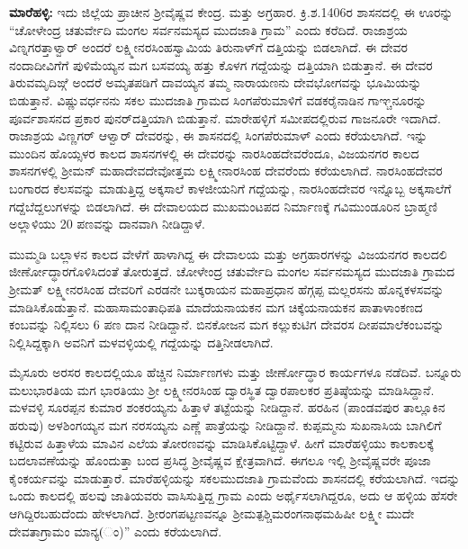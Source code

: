 \textbf{ಮಾರೆಹಳ್ಳಿ:} ಇದು ಜಿಲ್ಲೆಯ ಪ್ರಾಚೀನ ಶ‍್ರೀವೈಷ್ಣವ ಕೇಂದ್ರ. ಮತ್ತು ಅಗ್ರಹಾರ. ಕ್ರಿ.ಶ.1406ರ ಶಾಸನದಲ್ಲಿ ಈ ಊರನ್ನು “ಚೋಳೇಂದ್ರ ಚತುರ್ವೇದಿ ಮಂಗಲ ಸರ್ವನಮಸ್ಯದ ಮುದಜಾತಿ ಗ್ರಾಮ” ಎಂದು ಕರೆದಿದೆ. ರಾಜಾಶ್ರಯ ವಿಣ್ನಗರತ್ತಾಳ್ವಾರ್​ ಅಂದರೆ ಲಕ್ಷ್ಮೀನರಸಿಂಹಸ್ವಾಮಿಯ ತಿರುನಾಳ್​ಗೆ ದತ್ತಿಯನ್ನು ಬಿಡಲಾಗಿದೆ. ಈ ದೇವರ ನಂದಾದೀವಿಗೆಗೆ ಪುಳಿಮೆಯ್ಯನ ಮಗ ಬಸವಯ್ಯ ಹತ್ತು ಕೊಳಗ ಗದ್ದೆಯನ್ನು ದತ್ತಿಯಾಗಿ ಬಿಡುತ್ತಾನೆ. ಈ ದೇವರ ತಿರುವಮೃದಿಙ್ಗೆ ಅಂದರೆ ಅಮೃತಪಡಿಗೆ ದಾವಯ್ಯನ ತಮ್ಮ ನಾರಾಯಣನು ದೇವಭೋಗವನ್ನು ಭೂಮಿಯನ್ನು ಬಿಡುತ್ತಾನೆ. ವಿಷ್ಣುವರ್ಧನನು ಸಕಲ ಮುದಜಾತಿ ಗ್ರಾಮದ ಸಿಂಗಪೆರುಮಾಳಿಗೆ ವಡಕರೈನಾಡಿನ ಗಾಞ್ಚನೂರನ್ನು ಪೂರ್ವಶಾಸನದ ಪ್ರಕಾರ ಪುನರ್​ದತ್ತಿಯಾಗಿ ಬಿಡುತ್ತಾನೆ. ಮಾರೇಹಳ್ಳಿಗೆ ಸಮೀಪದಲ್ಲಿರುವ ಗಾಜನೂರೇ ಇದಾಗಿದೆ. ರಾಜಾಶ್ರಯ ವಿಣ್ಣಗರ್​ ಆಳ್ವಾರ್​ ದೇವರನ್ನು, ಈ ಶಾಸನದಲ್ಲಿ ಸಿಂಗಪೆರುಮಾಳ್​ ಎಂದು ಕರೆಯಲಾಗಿದೆ. ಇನ್ನು ಮುಂದಿನ ಹೊಯ್ಸಳರ ಕಾಲದ ಶಾಸನಗಳಲ್ಲಿ ಈ ದೇವರನ್ನು ನಾರಸಿಂಹದೇವರೆಂದೂ, ವಿಜಯನಗರ ಕಾಲದ ಶಾಸನಗಳಲ್ಲಿ ಶ‍್ರೀಮನ್​ ಮಹಾದೇವದೇವೋತ್ತಮ ಲಕ್ಷ್ಮೀನಾರಸಿಂಹ ದೇವರೆಂದು ಕರೆಯಲಾಗಿದೆ. ನಾರಸಿಂಹದೇವರ ಬಂಗಾರದ ಕೆಲಸವನ್ನು ಮಾಡುತ್ತಿದ್ದ ಅಕ್ಕಸಾಲೆ ಕಾಳಜೀಯನಿಗೆ ಗದ್ದೆಯನ್ನು, ನಾರಸಿಂಹದೇವರ ಇನ್ನೊಬ್ಬ ಅಕ್ಕಸಾಲೆಗೆ ಗದ್ದೆಬೆದ್ದಲುಗಳನ್ನು ಬಿಡಲಾಗಿದೆ. ಈ ದೇವಾಲಯದ ಮುಖಮಂಟಪದ ನಿರ್ಮಾಣಕ್ಕೆ ಗವಿಮುಂಡೂರಿನ ಬ್ರಾಹ್ಮಣಿ ಅಲ್ಲಾಳಿಯು 20 ಪಣವನ್ನು ದಾನವಾಗಿ ನೀಡಿದ್ದಾಳೆ.

ಮುಮ್ಮಡಿ ಬಲ್ಲಾಳನ ಕಾಲದ ವೇಳೆಗೆ ಹಾಳಾಗಿದ್ದ ಈ ದೇವಾಲಯ ಮತ್ತು ಅಗ್ರಹಾರಗಳನ್ನು ವಿಜಯನಗರ ಕಾಲದಲಿ ಜೀರ್ಣೋದ್ಧಾರಗೊಳಿಸಿದಂತೆ ತೋರುತ್ತದೆ. ಚೋಳೇಂದ್ರ ಚತುರ್ವೇದಿ ಮಂಗಲ ಸರ್ವನಮಸ್ಯದ ಮುದಜಾತಿ ಗ್ರಾಮದ ಶ‍್ರೀಮತ್​ ಲಕ್ಷ್ಮೀನರಸಿಂಹ ದೇವರಿಗೆ ಎರಡನೇ ಬುಕ್ಕರಾಯನ ಮಹಾಪ್ರಧಾನ ಹೆಗ್ಗಪ್ಪ ಮಲ್ಲರಸನು ಹೊನ್ನಕಳಸವನ್ನು ಮಾಡಿಸಿಕೊಡುತ್ತಾನೆ. ಮಹಾಸಾಮಂತಾಧಿಪತಿ ಮಾದೆಯನಾಯಕನ ಮಗ ಚಿಕ್ಕೆಯನಾಯಕನ ಪಾತಾಳಾಂಕಣದ ಕಂಬವನ್ನು ನಿಲ್ಲಿಸಲು 6 ಪಣ ದಾನ ನೀಡಿದ್ದಾನೆ. ಬಿನಕೋಜನ ಮಗ ಕಲ್ಲುಕುಟಿಗ ದೇವರಸ ದೀಪಮಾಲೆಕಂಬವನ್ನು ನಿಲ್ಲಿಸಿದ್ದಕ್ಕಾಗಿ ಅವನಿಗೆ ಮಳವಳ್ಳಿಯಲ್ಲಿ ಗದ್ದೆಯನ್ನು ದತ್ತಿನೀಡಲಾಗಿದೆ.

ಮೈಸೂರು ಅರಸರ ಕಾಲದಲ್ಲಿಯೂ ಹೆಚ್ಚಿನ ನಿರ್ಮಾಣಗಳು ಮತ್ತು ಜೀರ್ಣೋದ್ಧಾರ ಕಾರ್ಯಗಳೂ ನಡೆದಿವೆ. ಬನ್ನೂರು ಮಲುಭಾರತಿಯ ಮಗ ಭಾರತಿಯು ಶ‍್ರೀ ಲಕ್ಷ್ಮೀನರಸಿಂಹ ದ್ವಾರಸ್ಥಿತ ದ್ವಾರಪಾಲಕರ ಪ್ರತಿಷ್ಠೆಯನ್ನು ಮಾಡಿಸಿದ್ದಾನೆ. ಮಳವಳ್ಳಿ ಸೂರಪ್ಪನ ಕುಮಾರ ಶಂಕರಯ್ಯನು ಹಿತ್ತಾಳೆ ತಟ್ಟೆಯನ್ನು ನೀಡಿದ್ದಾನೆ. ಹರಹಿನ (ಪಾಂಡವಪುರ ತಾಲ್ಲೂಕಿನ ಹರುವು) ಅಳಶಿಂಗಯ್ಯನ ಮಗ ನರಸಯ್ಯನು ಎಣ್ಣೆ ಪಾತ್ರೆಯನ್ನು ನೀಡಿದ್ದಾನೆ. ಕುಪ್ಪಮ್ಮನು ಸುಖನಾಸಿಯ ಬಾಗಿಲಿಗೆ ಕಟ್ಟಿರುವ ಹಿತ್ತಾಳೆಯ ಮಾವಿನ ಎಲೆಯ ತೋರಣವನ್ನು ಮಾಡಿಸಿಕೊಟ್ಟಿದ್ದಾಳೆ. ಹೀಗೆ ಮಾರೆಹಳ್ಳಿಯು ಕಾಲಕಾಲಕ್ಕೆ ಬದಲಾವಣೆಯನ್ನು ಹೊಂದುತ್ತಾ ಬಂದ ಪ್ರಸಿದ್ಧ ಶ‍್ರೀವೈಷ್ಣವ ಕ್ಷೇತ್ರವಾಗಿದೆ. ಈಗಲೂ ಇಲ್ಲಿ ಶ‍್ರೀವೈಷ್ಣವರೇ ಪೂಜಾ ಕೈಂಕರ್ಯವನ್ನು ಮಾಡುತ್ತಾರೆ. ಮಾರೆಹಳ್ಳಿಯನ್ನು ಸಕಲಮುದಜಾತಿ ಗ್ರಾಮವೆಂದು ಶಾಸನದಲ್ಲಿ ಕರೆಯಲಾಗಿದೆ. ಇದನ್ನು ಒಂದು ಕಾಲದಲ್ಲಿ ಹಲವು ಜಾತಿಯವರು ವಾಸಿಸುತ್ತಿದ್ದ ಗ್ರಾಮ ಎಂದು ಅರ್ಥೈಸಲಾಗಿದ್ದರೂ, ಅದು ಆ ಹಳ್ಳಿಯ ಹೆಸರೇ ಆಗಿದ್ದಿರಬಹುದೆಂದು ಹೇಳಲಾಗಿದೆ. ಶ‍್ರೀರಂಗಪಟ್ಟಣವನ್ನೂ ಶ‍್ರೀಮತ್ಪಶ್ಚಿಮರಂಗನಾಥಮಹಿಷೀ ಲಕ್ಷ್ಮೀ ಮುದೇ ದೇವತಾಗ್ರಾಮಂ ಮಾನ್ಯ(ಂ)” ಎಂದು ಕರೆಯಲಾಗಿದೆ.

